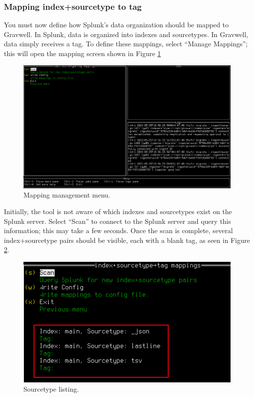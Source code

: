\clearpage
\subsubsection{Mapping index+sourcetype to tag}

You must now define how Splunk's data organization should be mapped to Gravwell. In Splunk, data is organized into indexes and sourcetypes. In Gravwell, data simply receives a tag. To define these mappings, select ``Manage Mappings''; this will open the mapping screen shown in Figure \ref{fig:splunkmappings}

\begin{figure}
	\includegraphics[width=0.95\linewidth]{images/splunkmappings.png}
	\caption{Mapping management menu.}
	\label{fig:splunkmappings}
\end{figure}

Initially, the tool is not aware of which indexes and sourcetypes exist on the Splunk server. Select ``Scan'' to connect to the Splunk server and query this information; this may take a few seconds. Once the scan is complete, several index+sourcetype pairs should be visible, each with a blank tag, as seen in Figure \ref{fig:sourcetypes}.

\begin{figure}
	\includegraphics[width=0.95\linewidth]{images/sourcetypes.png}
	\caption{Sourcetype listing.}
	\label{fig:sourcetypes}
\end{figure}

